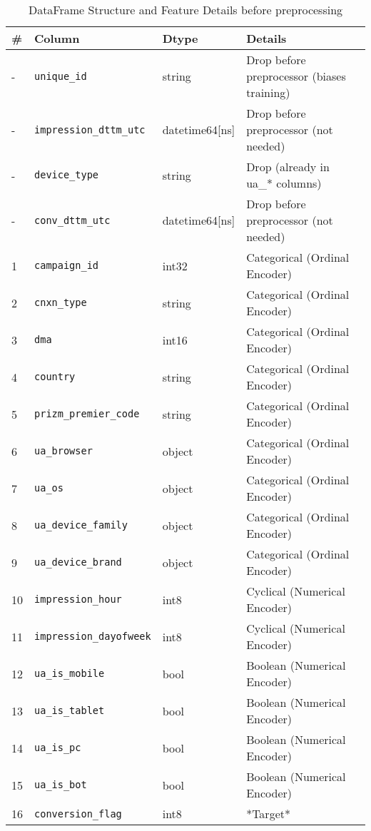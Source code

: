 \documentclass[11pt]{article}
\begin{document}
\begin{table}[H]
\caption{DataFrame Structure and Feature Details before preprocessing}
\label{tab:data_columns}
\begin{tabular}{ll@{\quad\quad}l@{\quad\quad\quad}l}
\toprule
\# & \textbf{Column} & \textbf{Dtype} & \textbf{Details} \\
\midrule
- & \texttt{unique\_id} & string & Drop before preprocessor (biases training) \\
- & \texttt{impression\_dttm\_utc} & datetime64[ns] & Drop before preprocessor (not needed) \\
- & \texttt{device\_type} & string & Drop (already in ua\_* columns) \\
- & \texttt{conv\_dttm\_utc} & datetime64[ns] & Drop before preprocessor (not needed) \\
\midrule
1 & \texttt{campaign\_id} & int32 & Categorical (Ordinal Encoder) \\
2 & \texttt{cnxn\_type} & string & Categorical (Ordinal Encoder) \\
3 & \texttt{dma} & int16 & Categorical (Ordinal Encoder) \\
4 & \texttt{country} & string & Categorical (Ordinal Encoder) \\
5 & \texttt{prizm\_premier\_code} & string & Categorical (Ordinal Encoder) \\
6 & \texttt{ua\_browser} & object & Categorical (Ordinal Encoder) \\
7 & \texttt{ua\_os} & object & Categorical (Ordinal Encoder) \\
8 & \texttt{ua\_device\_family} & object & Categorical (Ordinal Encoder) \\
9 & \texttt{ua\_device\_brand} & object & Categorical (Ordinal Encoder) \\
\midrule
10 & \texttt{impression\_hour} & int8 & Cyclical (Numerical Encoder) \\
11 & \texttt{impression\_dayofweek} & int8 & Cyclical (Numerical Encoder) \\
\midrule
12 & \texttt{ua\_is\_mobile} & bool & Boolean (Numerical Encoder) \\
13 & \texttt{ua\_is\_tablet} & bool & Boolean (Numerical Encoder) \\
14 & \texttt{ua\_is\_pc} & bool & Boolean (Numerical Encoder) \\
15 & \texttt{ua\_is\_bot} & bool & Boolean (Numerical Encoder) \\
\midrule
16 & \texttt{conversion\_flag} & int8 & *Target* \\
\bottomrule
\end{tabular}
\end{table}
\end{document}
